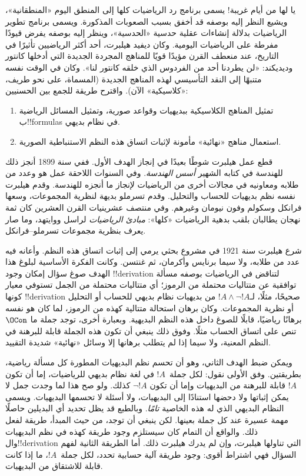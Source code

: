 \documentclass[../../../include/open-logic-section]{subfiles}
\begin{document}
يا لها من أيام غريبة!{} يسمى برنامج رد الرياضيات كلها إلى المنطق
اليوم «المنطقانية»، ويشيع النظر إليه بوصفه قد أخفق بسبب الصعوبات
المذكورة. ويسمى برنامج تطوير الرياضيات بدلالة إنشاءات عقلية حدسية
«الحدسية»، وينظر إليه بوصفه يفرض قيودًا مفرطة على الرياضيات اليومية.
وكان ديفيد هيلبرت، أحد أكثر الرياضيين تأثيرًا في التاريخ، عند منعطف
القرن مؤيدًا قويًا للمناهج المجردة الجديدة التي أدخلها كانتور
وديديكند: «لن يطردنا أحد من الفردوس الذي خلقه كانتور لنا». وكان في
الوقت نفسه متنبهًا إلى النقد التأسيسي لهذه المناهج الجديدة (المسماة،
على نحو طريف، «كلاسيكية» الآن). واقترح طريقة للجمع بين الحسنيين:
\begin{enumerate}
\item تمثيل المناهج الكلاسيكية ببديهيات وقواعد صورية، وتمثيل المسائل
  الرياضية ب!!{formula}s في نظام بديهي.
\item استعمال مناهج «نهائية» مأمونة لإثبات اتساق هذه النظم الاستنباطية
  الصورية.
\end{enumerate}

قطع عمل هيلبرت شوطًا بعيدًا في إنجاز الهدف الأول. ففي سنة 1899 أنجز
ذلك للهندسة في كتابه الشهير \emph{أسس الهندسة}. وفي السنوات اللاحقة
عمل هو وعدد من طلابه ومعاونيه في مجالات أخرى من الرياضيات لإنجاز ما
أنجزه للهندسة. وقدم هيلبرت نفسه نظم بديهيات للحساب والتحليل. وقدم
تسرملو بديهة لنظرية المجموعات، وسعها فرانكل وسكولم وفون نيومان
وغيرهم. وفي منتصف عشرينيات القرن العشرين كان ثمة نهجان يطالبان بلقب
بدهية الرياضيات «كلها»: \emph{مبادئ الرياضيات} لراسل ووايتهد، وما
صار يعرف بنظرية مجموعات تسرملو--فرانكل.

شرع هيلبرت سنة 1921 في مشروع بحثي يرمي إلى إثبات اتساق هذه النظم.
وأعانه فيه عدد من طلابه، ولا سيما برنايس وأكرمان، ثم غنتسن. وكانت
الفكرة الأساسية لبلوغ هذا الهدف صوغ سؤال إمكان وجود !!{derivation}
لتناقض في الرياضيات بوصفه مسألة توافقية عن متتاليات محتملة من الرموز؛
أي متتاليات محتملة من الجمل تستوفي معيار كونها !!{derivation}
صحيحًا، مثلًا، لـ$!A\land\lnot !A$ من بديهيات نظام بديهي للحساب أو
التحليل أو نظرية المجموعات. وكان برهان استحالة متتالية كهذه من
الرموز، لما كان هو نفسه برهانًا رياضيًا، قابلًا للصوغ داخل هذه النظم
البديهية. وبعبارة أخرى، توجد جملة ما $\OCon$ تنص على اتساق الحساب
مثلًا. وفوق ذلك ينبغي أن تكون هذه الجملة قابلة للبرهنة في النظم
المعنية، ولا سيما إذا لم يتطلب برهانها إلا وسائل «نهائية» شديدة
التقييد.

ويمكن ضبط الهدف الثاني، وهو أن تحسم نظم البديهيات المطورة كل مسألة
رياضية، بطريقتين. وفق الأولى نقول: لكل جملة~$!A$ في لغة نظام بديهي
للرياضيات، إما أن تكون $!A$ قابلة للبرهنة من البديهيات وإما أن تكون
$\lnot !A$ كذلك. ولو صح هذا لما وجدت جمل لا يمكن إثباتها ولا دحضها
استنادًا إلى البديهيات، ولا أسئلة لا تحسمها البديهيات. ويسمى النظام
البديهي الذي له هذه الخاصية \emph{تامًا}. وبالطبع قد يظل تحديد أي
البديلين حاصلًا مهمة عسيرة عند كل جملة بعينها. لكن ينبغي أن توجد، من
حيث المبدأ، طريقة لفعل ذلك. والواقع أن التمام كان سيستلزم وجود طريقة
كهذه في نظم البديهيات وال!!{derivation} التي تناولها هيلبرت، وإن لم يدرك
هيلبرت ذلك. أما الطريقة الثانية لفهم السؤال فهي اشتراط أقوى: وجود
طريقة آلية حسابية تحدد، لكل جملة~$!A$، ما إذا كانت قابلة للاشتقاق من
البديهيات.
\end{document}

